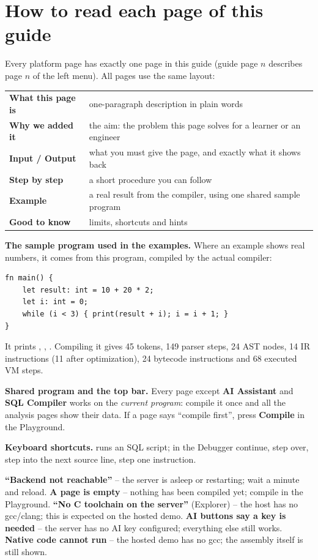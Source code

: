 \documentclass[12pt,a4paper]{article}
\newcommand{\ui}[1]{\textbf{\sffamily\small #1}}
\begin{document}
\section*{How to read each page of this guide}
Every platform page has exactly one page in this guide (guide page $n$ describes page $n$ of the left menu). All pages use the same layout:
\begin{center}\small
\begin{tabularx}{\linewidth}{@{}>{\bfseries\sffamily\color{indigo}}l X@{}}\toprule
What this page is&one-paragraph description in plain words\\
Why we added it&the aim: the problem this page solves for a learner or an engineer\\
Input / Output&what you must give the page, and exactly what it shows back\\
Step by step&a short procedure you can follow\\
Example&a real result from the compiler, using one shared sample program\\
Good to know&limits, shortcuts and hints\\\bottomrule
\end{tabularx}
\end{center}
\textbf{The sample program used in the examples.} Where an example shows real numbers, it comes from this program, compiled by the actual compiler:
\begin{lstlisting}
fn main() {
    let result: int = 10 + 20 * 2;
    let i: int = 0;
    while (i < 3) { print(result + i); i = i + 1; }
}
\end{lstlisting}
It prints , , . Compiling it gives 45 tokens, 149 parser steps, 24 AST nodes, 14 IR instructions (11 after optimization), 24 bytecode instructions and 68 executed VM steps.

\textbf{Shared program and the top bar.} Every page except \ui{AI Assistant} and \ui{SQL Compiler} works on the \emph{current program}: compile it once and all the analysis pages show their data. If a page says ``compile first'', press \ui{Compile} in the Playground.

\textbf{Keyboard shortcuts.}  runs an SQL script; in the Debugger  continue,  step over,  step into the next source line,  step one instruction.

\begin{note}[Troubleshooting]\small
\textbf{``Backend not reachable''} -- the server is asleep or restarting; wait a minute and reload. \textbf{A page is empty} -- nothing has been compiled yet; compile in the Playground. \textbf{``No C toolchain on the server''} (Explorer) -- the host has no gcc/clang; this is expected on the hosted demo. \textbf{AI buttons say a key is needed} -- the server has no AI key configured; everything else still works. \textbf{Native code cannot run} -- the hosted demo has no gcc; the assembly itself is still shown.
\end{note}
\end{document}
